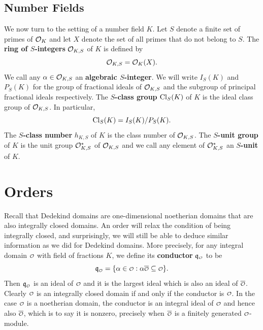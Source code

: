     \subsection*{Number Fields}
      We now turn to the setting of a number field \(K\). Let \(S\) denote a finite set of primes of \(\mathcal{O}_{K}\) and let \(X\) denote the set of all primes that do not belong to \(S\). The \textbf{ring of \(S\)-integers} \(\mathcal{O}_{K,S}\) of \(K\) is defined by
      \[
        \mathcal{O}_{K,S} = \mathcal{O}_{K}(X).
      \]
      We call any \(\alpha \in \mathcal{O}_{K,S}\) an \textbf{algebraic \(S\)-integer}.  We will write \(I_{S}(K)\) and \(P_{S}(K)\) for the group of fractional ideals of \(\mathcal{O}_{K,S}\) and the subgroup of principal fractional ideals respectively. The \textbf{\(S\)-class group} \(\operatorname{\mathrm{Cl}}_{S}(K)\) of \(K\) is the ideal class group of \(\mathcal{O}_{K,S}\). In particular,
      \[
        \operatorname{\mathrm{Cl}}_{S}(K) = I_{S}(K)/P_{S}(K).
      \]
      The \textbf{\(S\)-class number} \(h_{K,S}\) of \(K\) is the class number of \(\mathcal{O}_{K,S}\). The \textbf{\(S\)-unit group} of \(K\) is the unit group \(\mathcal{O}_{K,S}^{\ast}\) of \(\mathcal{O}_{K,S}\) and we call any element of \(\mathcal{O}_{K,S}^{\ast}\) an \textbf{\(S\)-unit} of \(K\).
  \section{Orders}
    Recall that Dedekind domains are one-dimensional noetherian domains that are also integrally closed domains. An order will relax the condition of being integrally closed, and surprisingly, we will still be able to deduce similar information as we did for Dedekind domains. More precisely, for any integral domain \(\smc{O}\) with field of fractions \(K\), we define its \textbf{conductor} \(\mf{q}_{\smc{O}}\) to be
    \[
      \mf{q}_{\smc{O}} = \{\a \in \smc{O}:\a\conj{\smc{O}} \subseteq \smc{O}\}.
    \]
    Then \(\mf{q}_{\smc{O}}\) is an ideal of \(\smc{O}\) and it is the largest ideal which is also an ideal of \(\conj{\smc{O}}\). Clearly \(\smc{O}\) is an integrally closed domain if and only if the conductor is \(\smc{O}\). In the case \(\smc{O}\) is a noetherian domain, the conductor is an integral ideal of \(\smc{O}\) and hence also \(\conj{\smc{O}}\), which is to say it is nonzero, precisely when \(\conj{\smc{O}}\) is a finitely generated \(\smc{O}\)-module.


